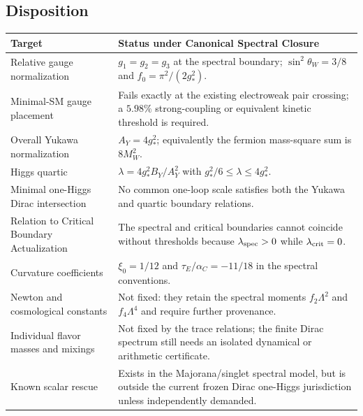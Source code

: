 \subsection{Disposition}

\begin{remark}
\begin{center}
\small
\begin{tabularx}{\textwidth}{l Y}
\toprule
Target & Status under Canonical Spectral Closure \\
\midrule
Relative gauge normalization
& $g_1=g_2=g_3$ at the spectral boundary; $\sin^2\theta_W=3/8$ and
  $f_0=\pi^2/(2g_*^2)$. \\
Minimal-SM gauge placement
& Fails exactly at the existing electroweak pair crossing; a $5.98\%$ strong-coupling or
  equivalent kinetic threshold is required. \\
Overall Yukawa normalization
& $A_Y=4g_*^2$; equivalently the fermion mass-square sum is $8M_W^2$. \\
Higgs quartic
& $\lambda=4g_*^2B_Y/A_Y^2$ with $g_*^2/6\le\lambda\le4g_*^2$. \\
Minimal one-Higgs Dirac intersection
& No common one-loop scale satisfies both the Yukawa and quartic boundary relations. \\
Relation to Critical Boundary Actualization
& The spectral and critical boundaries cannot coincide without thresholds because
  $\lambda_{\rm spec}>0$ while $\lambda_{\rm crit}=0$. \\
Curvature coefficients
& $\xi_0=1/12$ and $\tau_E/\alpha_C=-11/18$ in the spectral conventions. \\
Newton and cosmological constants
& Not fixed: they retain the spectral moments $f_2\Lambda^2$ and $f_4\Lambda^4$ and require
  further provenance. \\
Individual flavor masses and mixings
& Not fixed by the trace relations; the finite Dirac spectrum still needs an isolated
  dynamical or arithmetic certificate. \\
Known scalar rescue
& Exists in the Majorana/singlet spectral model, but is outside the current frozen Dirac
  one-Higgs jurisdiction unless independently demanded. \\
\bottomrule
\end{tabularx}
\end{center}
\end{remark}

